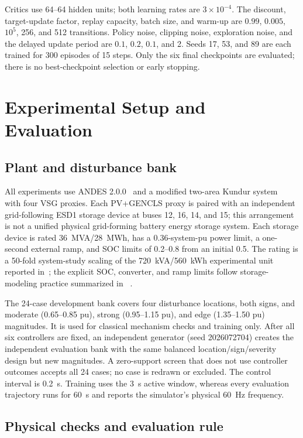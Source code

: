 \documentclass[conference,a4paper]{IEEEtran}
\begin{document}
Critics use 64--64 hidden units; both learning rates are
\(3\times10^{-4}\). The discount, target-update factor, replay capacity,
batch size, and warm-up are \(0.99\), \(0.005\), \(10^5\), 256, and 512
transitions. Policy noise, clipping noise, exploration noise, and the delayed
update period are \(0.1\), \(0.2\), \(0.1\), and 2. Seeds 17, 53, and 89 are
each trained for 300 episodes of 15 steps. Only the six final checkpoints are
evaluated; there is no best-checkpoint selection or early stopping.

\section{Experimental Setup and Evaluation}

\subsection{Plant and disturbance bank}

All experiments use ANDES 2.0.0~\cite{cui2021andes} and a modified two-area
Kundur system~\cite{kundur1994} with four VSG proxies. Each PV+GENCLS proxy is
paired with an independent grid-following ESD1 storage device at buses 12, 16,
14, and 15; this arrangement is not a unified physical grid-forming battery
energy storage system. Each storage device is rated
\SI{36}{MVA}/\SI{28}{MWh}, has a 0.36-system-pu power limit, a one-second
external ramp, and SOC limits of 0.2--0.8 from an initial 0.5. The rating is a
50-fold system-study scaling of the \SI{720}{kVA}/\SI{560}{kWh} experimental
unit reported in~\cite{gerini2022gfm}; the explicit SOC, converter, and ramp
limits follow storage-modeling practice summarized in
~\cite{wecc2016bess}.

The 24-case development bank covers four disturbance locations, both signs,
and moderate (0.65--0.85 pu), strong (0.95--1.15 pu), and edge
(1.35--1.50 pu) magnitudes. It is used for classical mechanism checks and
training only. After all six controllers are fixed, an independent generator
(seed 2026072704) creates the independent evaluation bank with the same balanced
location/sign/severity design but new magnitudes. A zero-support screen that
does not use controller outcomes accepts all 24 cases; no case is redrawn or
excluded. The control interval is
\SI{0.2}{s}. Training uses the \SI{3}{s} active window, whereas every
evaluation trajectory runs for \SI{60}{s} and reports the simulator's physical
\SI{60}{Hz} frequency.

\subsection{Physical checks and evaluation rule}
\end{document}
